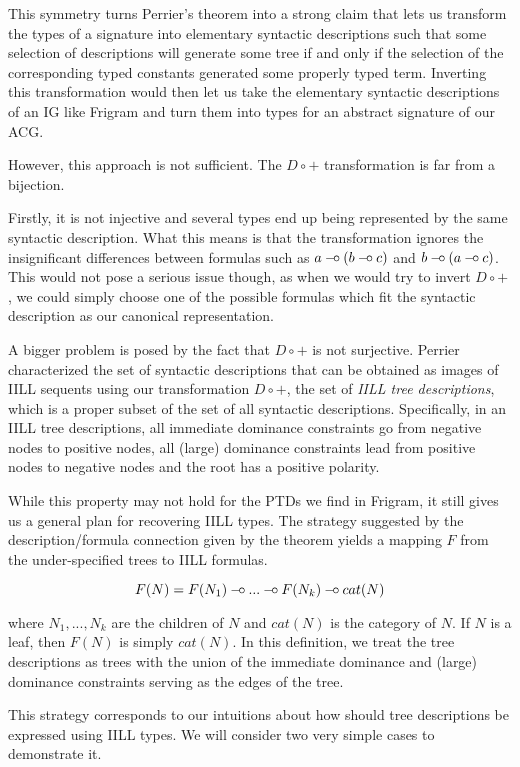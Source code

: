 This symmetry turns Perrier's theorem into a strong claim that lets us
transform the types of a signature into elementary syntactic
descriptions such that some selection of descriptions will generate some
tree if and only if the selection of the corresponding typed constants
generated some properly typed term. Inverting this transformation would
then let us take the elementary syntactic descriptions of an IG like
Frigram and turn them into types for an abstract signature of our ACG.

However, this approach is not sufficient. The $D \circ +$ transformation
is far from a bijection.

Firstly, it is not injective and several types end up being represented
by the same syntactic description. What this means is that the
transformation ignores the insignificant differences between formulas
such as $a \mathbin{{-}\mkern-3.5mu{\circ}} (b \mathbin{{-}\mkern-3.5mu{\circ}} c)$ and $b \mathbin{{-}\mkern-3.5mu{\circ}} (a \mathbin{{-}\mkern-3.5mu{\circ}} c)$. This would not
pose a serious issue though, as when we would try to invert $D \circ +$,
we could simply choose one of the possible formulas which fit the
syntactic description as our canonical representation.

A bigger problem is posed by the fact that $D \circ +$ is not
surjective. Perrier \cite{perrier2001intuitionistic} characterized the
set of syntactic descriptions that can be obtained as images of IILL
sequents using our transformation $D \circ +$, the set of \emph{IILL
  tree descriptions}, which is a proper subset of the set of all
syntactic descriptions. Specifically, in an IILL tree descriptions, all
immediate dominance constraints go from negative nodes to positive
nodes, all (large) dominance constraints lead from positive nodes to
negative nodes and the root has a positive polarity.

While this property may not hold for the PTDs we find in Frigram, it
still gives us a general plan for recovering IILL types. The strategy
suggested by the description/formula connection given by the theorem
yields a mapping $F$ from the under-specified trees to IILL formulas.

$$
F(N) = F(N_1) \mathbin{{-}\mkern-3.5mu{\circ}} ... \mathbin{{-}\mkern-3.5mu{\circ}} F(N_k) \mathbin{{-}\mkern-3.5mu{\circ}} cat(N)
$$

where $N_1, ..., N_k$ are the children of $N$ and $cat(N)$ is the
category of $N$. If $N$ is a leaf, then $F(N)$ is simply $cat(N)$. In
this definition, we treat the tree descriptions as trees with the union
of the immediate dominance and (large) dominance constraints serving as
the edges of the tree.

This strategy corresponds to our intuitions about how should tree
descriptions be expressed using IILL types. We will consider two very
simple cases to demonstrate it.

